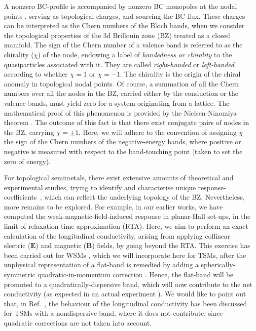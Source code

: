 \documentclass[aps,prb,onecolumn,nofootinbib,citeautoscript,10pt]{revtex4-2}
\begin{document}
A nonzero BC-profile is accompanied by nonzero BC monopoles at the nodal points \cite{fuchs-review, polash-review}, serving as topological charges, and sourcing the BC flux. These charges can be interpreted as the Chern numbers of the Bloch bands, when we consider the topological properties of the 3d Brillouin zone (BZ) treated as a closed manifold. The sign of the Chern number of a valence band is referred to as the chirality ($\chi$) of the node, endowing a label of \textit{handedness or chirality} to the quasiparticles associated with it. They are called \textit{right-handed} or \textit{left-handed} according to whether $\chi = 1$ or $\chi = -1$. The chirality is the origin of the chiral anomaly in topological nodal points. Of course, a summation of all the Chern numbers over all the nodes in the BZ, carried either by the conduction or the valence bands, must yield zero for a system originating from a lattice. The mathematical proof of this phenomenon is provided by the Nielsen-Ninomiya theorem \cite{nielsen81_no}. The outcome of this fact is that there exist conjugate pairs of nodes in the BZ, carrying $\chi = \pm 1$. Here, we will adhere to the convention of assigning $\chi$ the sign of the Chern numbers of the negative-energy bands, where positive or negative is measured with respect to the band-touching point (taken to set the zero of energy). 



For topological semimetals, there exist extensive amounts of theoretical and experimental studies, trying to identify and characterise unique response-coefficients~\cite{zhang16_linear, chen16_thermoelectric, nandy_2017_chiral, nandy18_Berry, amit_magneto, das20_thermal, das22_nonlinear, pal22a_berry, pal22b_berry, fu22_thermoelectric, araki20_magnetic, mizuta14_contribution,timm, onofre, ips_rahul_ph_strain, rahul-jpcm, ips-kush-review, claudia-multifold, ips-ruiz, ips-tilted, ips-internode, ips-nl-ph}, which can reflect the underlying topology of the BZ. Nevertheless, more remains to be explored. For example, in our earlier works, we have computed the weak-magnetic-field-induced response in planar-Hall set-ups, in the limit of relaxation-time approximation (RTA). Here, we aim to perform an exact calculation of the longitudinal conductivity, arising from applying collinear electric ($\boldsymbol   E $) and magnetic ($\boldsymbol B $) fields, by going beyond the RTA. This exercise has been carried out for WSMs \cite{timm, girish2023}, which we will incorporate here for TSMs, after the unphysical representation of a flat-band is remedied by adding a spherically-symmetric quadratic-in-momentum correction \cite{ni2021_giant}. Hence, the flat-band will be promoted to a quadratically-dispersive band, which will now contribute to the net conductivity (as expected in an actual experiment \cite{claudia-multifold}). We would like to point out that, in Ref.~\cite{girish-internode-spin1}, the behaviour of the longitudinal conductivity has been discussed for TSMs with a nondispersive band, where it does not contribute, since quadratic corrections are not taken into account.
 
\end{document}
